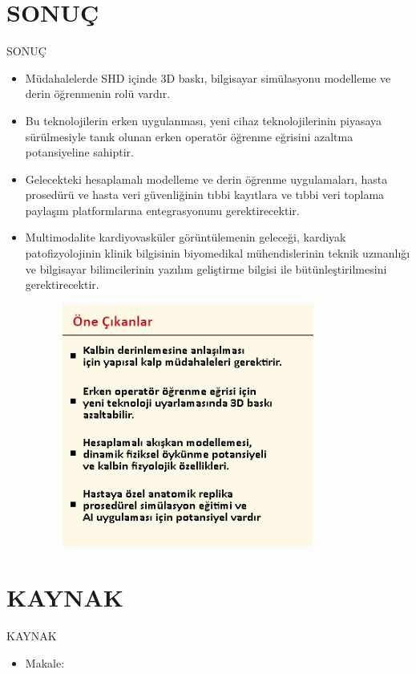 \documentclass{beamer}
\begin{document}
\section{SONUÇ}

\begin{frame}{SONUÇ}

\begin{itemize}
  \item Müdahalelerde SHD içinde 3D baskı, bilgisayar simülasyonu modelleme ve derin öğrenmenin rolü vardır. 
  \item Bu teknolojilerin erken uygulanması, yeni cihaz teknolojilerinin piyasaya sürülmesiyle tanık olunan erken operatör öğrenme eğrisini azaltma potansiyeline sahiptir. 
  \item Gelecekteki hesaplamalı modelleme ve derin öğrenme uygulamaları, hasta prosedürü ve hasta veri güvenliğinin tıbbi kayıtlara ve tıbbi veri toplama paylaşım platformlarına entegrasyonunu gerektirecektir. 
  \item Multimodalite kardiyovasküler görüntülemenin geleceği, kardiyak patofizyolojinin klinik bilgisinin biyomedikal mühendislerinin teknik uzmanlığı ve bilgisayar bilimcilerinin yazılım geliştirme bilgisi ile bütünleştirilmesini gerektirecektir. 
\end{itemize}

\end{frame}

\begin{frame}{}
\begin{block}{}
\includegraphics[width=12cm,height=8cm]{Öne Çıkanlar.png}
\end{block}
\end{frame}

\section{KAYNAK}

\begin{frame}{KAYNAK}
\begin{itemize}
\item Makale: \cite{ELSEVIER}

\scriptsize

\end{itemize}
\end{frame}
\end{document}
